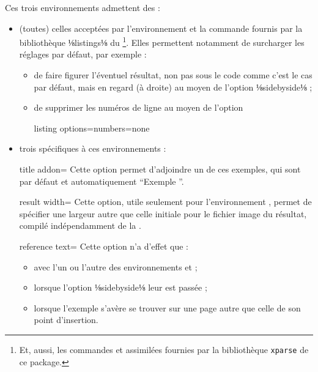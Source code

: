 \documentclass{letgut}
\begin{document}
Ces trois environnements admettent des  :
\begin{itemize}
\item (toutes) celles acceptées par l'environnement
   et la commande 
  fournis par la bibliothèque ⅛listings⅛ du
  \footnote{Et, aussi, les commandes
     et assimilées fournies par la bibliothèque
    \lstinline+xparse+ de ce package.}. Elles permettent notamment de surcharger
  les réglages par défaut, par exemple :
  \begin{itemize}
  \item de faire figurer l'éventuel résultat, non pas sous le code comme c'est
    le cas par défaut, mais en regard (à droite) au moyen de l'option
    ⅛sidebyside⅛ ;
  \item de supprimer les numéros de ligne au moyen de l'option
\begin{ltx-code}
listing options={numbers=none}
\end{ltx-code}
  \end{itemize}
\item trois spécifiques à ces environnements :
  \begin{docKey*}{title addon}{=}{\valinitdef}
    Cette option permet d'adjoindre un  de ces
    exemples, qui sont par défaut et automatiquement \enquote{Exemple }.
  \end{docKey*}
  \begin{docKey*}{result width}{=}{}
    Cette option, utile seulement pour l'environnement
    , permet de spécifier une largeur autre que
    celle initiale pour le fichier image du résultat, compilé indépendamment de
    la .
  \end{docKey*}
  \begin{docKey*}{reference text}{=}{}
    Cette option n'a d'effet que :
    \begin{itemize}
    \item avec l'un ou l'autre des environnements  et
       ;
    \item lorsque l'option ⅛sidebyside⅛ leur est passée ;
    \item lorsque l'exemple s'avère se trouver sur une page autre que
      celle de son point d'insertion.

\end{itemize}
\end{docKey*}
\end{itemize}
\end{document}

